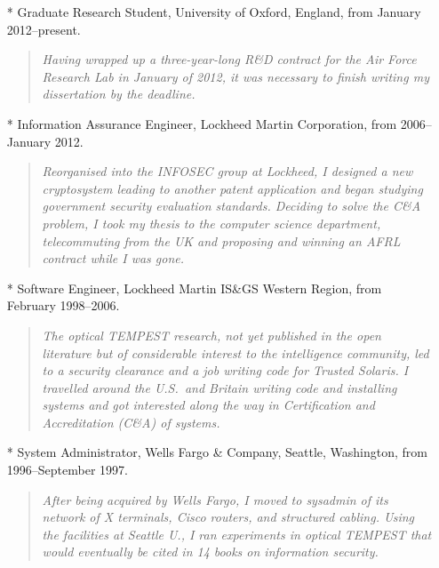 \documentclass[letterpaper]{article}
\begin{document}
\begin{itemize}
	\item[*] Graduate Research Student, University of Oxford, England, from January 2012--present.
		\begin{quote}\vspace{-2mm}
			\emph{Having wrapped up a three-year-long R\&D contract for the Air Force Research
			Lab in January of 2012, it was necessary to finish writing my dissertation by
			the deadline.}
		\end{quote}

	\item[*] Information Assurance Engineer, Lockheed Martin Corporation, from 2006--January 2012.
		\begin{quote}\vspace{-2mm}
			\emph{Reorganised into the INFOSEC group at Lockheed, I designed a new
			cryptosystem leading to another patent application and began studying
			government security evaluation standards.  Deciding to solve the C\&A problem,
			I took my thesis to the computer science department, telecommuting from the UK and
			proposing and winning an AFRL contract while I was gone.}
		\end{quote}

	\item[*] Software Engineer, Lockheed Martin IS\&GS Western Region, from February 1998--2006.
		\begin{quote}\vspace{-2mm}
			\emph{The optical TEMPEST research, not yet published in the open literature but of
			considerable interest to the intelligence community, led to a security clearance and
			a job writing code for Trusted Solaris.  I travelled around the U.S.\ and Britain
			writing code and installing systems and got interested along the way in
			Certification and Accreditation (C\&A) of systems.}
		\end{quote}

	\item[*] System Administrator, Wells Fargo \& Company, Seattle, Washington,
		from 1996--September 1997.
		\begin{quote}\vspace{-2mm}
			\emph{After being acquired by Wells Fargo, I moved to sysadmin of its network
			of X terminals, Cisco routers, and structured cabling.  Using the facilities
			at Seattle U., I ran experiments in optical TEMPEST that would eventually
			be cited in 14 books on information security.}
		\end{quote}


\end{itemize}
\end{document}
